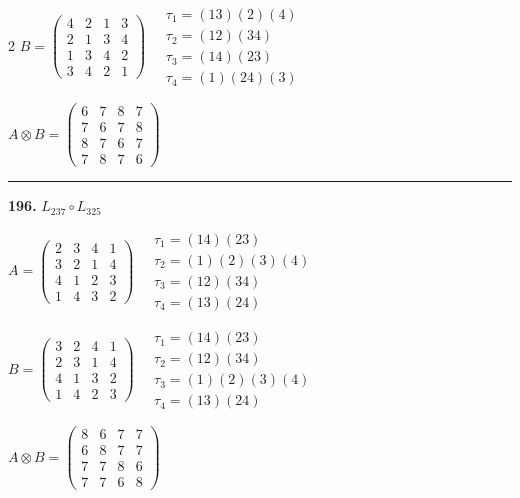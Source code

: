 \begin{multicols}{2}
$B = \begin{pmatrix} 4 & 2 & 1 & 3 \\ 2 & 1 & 3 & 4 \\ 1 & 3 & 4 & 2 \\ 3 & 4 & 2 & 1 \end{pmatrix} \quad \begin{matrix} \tau_{1}=(1 3)(2)(4) \\ \tau_{2}=(1 2)(3 4) \\ \tau_{3}=(1 4)(2 3) \\ \tau_{4}=(1)(2 4)(3) \end{matrix}$

$A \otimes B = \begin{pmatrix} 6 & 7 & 8 & 7 \\ 7 & 6 & 7 & 8 \\ 8 & 7 & 6 & 7 \\ 7 & 8 & 7 & 6 \end{pmatrix}$

\vspace{0.3em}
\hrule
\vspace{0.3em}

\noindent\textbf{196.} $L_{237} \circ L_{325}$

$A = \begin{pmatrix} 2 & 3 & 4 & 1 \\ 3 & 2 & 1 & 4 \\ 4 & 1 & 2 & 3 \\ 1 & 4 & 3 & 2 \end{pmatrix} \quad \begin{matrix} \tau_{1}=(1 4)(2 3) \\ \tau_{2}=(1)(2)(3)(4) \\ \tau_{3}=(1 2)(3 4) \\ \tau_{4}=(1 3)(2 4) \end{matrix}$

$B = \begin{pmatrix} 3 & 2 & 4 & 1 \\ 2 & 3 & 1 & 4 \\ 4 & 1 & 3 & 2 \\ 1 & 4 & 2 & 3 \end{pmatrix} \quad \begin{matrix} \tau_{1}=(1 4)(2 3) \\ \tau_{2}=(1 2)(3 4) \\ \tau_{3}=(1)(2)(3)(4) \\ \tau_{4}=(1 3)(2 4) \end{matrix}$

$A \otimes B = \begin{pmatrix} 8 & 6 & 7 & 7 \\ 6 & 8 & 7 & 7 \\ 7 & 7 & 8 & 6 \\ 7 & 7 & 6 & 8 \end{pmatrix}$


\end{multicols}
